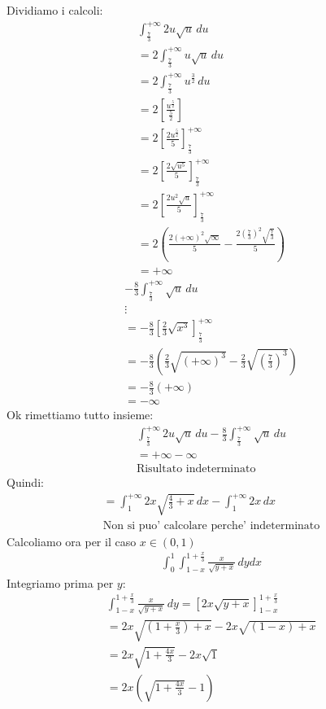 \documentclass{article}
\begin{document}
Dividiamo i calcoli:
\begin{align*}
    \int_{\frac{7}{3}}^{+\infty} 2u\sqrt{u}\,du \\
    =2\int_{\frac{7}{3}}^{+\infty} u\sqrt{u}\,du \\
    =2\int_{\frac{7}{3}}^{+\infty} u^{\frac{3}{2}}\,du \\
    =2[\frac{u^{\frac{5}{2}}}{\frac{5}{2}}] \\
    =2[\frac{2u^{\frac{5}{2}}}{5}]_{\frac{7}{3}}^{+\infty} \\
    =2[\frac{2\sqrt{u^5}}{5}]_{\frac{7}{3}}^{+\infty} \\
    =2[\frac{2u^2\sqrt{u}}{5}]_{\frac{7}{3}}^{+\infty} \\
    = 2(\frac{2(+\infty)^2\sqrt{\infty}}{5} - \frac{2(\frac{7}{3})^2\sqrt{\frac{7}{3}}}{5}) \\
    = +\infty
\end{align*}
\begin{align*}
    - \frac{8}{3}\int_{\frac{7}{3}}^{+\infty}\sqrt{u}\,du\\
    \vdots \\
    =-\frac{8}{3}[\frac{2}{3}\sqrt{x^3}]_{\frac{7}{3}}^{+\infty} \\
    =-\frac{8}{3}(\frac{2}{3}\sqrt{(+\infty)^3} - \frac{2}{3}\sqrt{(\frac{7}{3})^3}) \\
    =-\frac{8}{3}(+\infty) \\
    =-\infty
\end{align*}
Ok rimettiamo tutto insieme:
\begin{align*}
    \int_{\frac{7}{3}}^{+\infty} 2u\sqrt{u}\,du - \frac{8}{3}\int_{\frac{7}{3}}^{+\infty}\sqrt{u}\,du\\
    = +\infty -\infty \\
    \text{Risultato indeterminato}
\end{align*}
Quindi:
\begin{align*}
    = \int_1^{+\infty} 2x \sqrt{\frac{4}{3}+x}\, dx - \int_1^{+\infty} 2x \, dx \\
    \text{Non si puo' calcolare perche' indeterminato}
\end{align*}
Calcoliamo ora per il caso $x\in(0,1)$
\begin{align*}
    \int_0^{1} \int_{1-x}^{1+\frac{x}{3}} \frac{x}{\sqrt{y+x}} \,dydx
\end{align*}
Integriamo prima per $y$:
\begin{align*}
    \int_{1-x}^{1+\frac{x}{3}}\frac{x}{\sqrt{y+x}} \,dy = [2x \sqrt{y+x}]_{1-x}^{1+\frac{x}{3}} \\
    = 2x \sqrt{(1+\frac{x}{3})+x} - 2x \sqrt{(1-x)+x} \\
    = 2x \sqrt{1+\frac{4x}{3}}-2x\sqrt{1} \\
    = 2x(\sqrt{1+\frac{4x}{3}}-1)
\end{align*}
\end{document}

